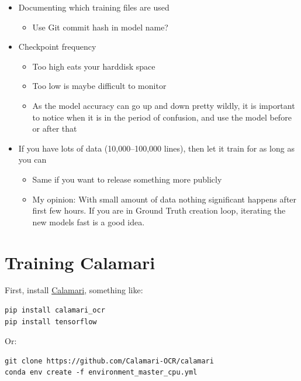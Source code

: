 \documentclass[]{book}
\providecommand{\tightlist}{%
  \setlength{\itemsep}{0pt}\setlength{\parskip}{0pt}}
\begin{document}
\begin{itemize}
\tightlist
\item
  Documenting which training files are used

  \begin{itemize}
  \tightlist
  \item
    Use Git commit hash in model name?
  \end{itemize}
\item
  Checkpoint frequency

  \begin{itemize}
  \tightlist
  \item
    Too high eats your harddisk space
  \item
    Too low is maybe difficult to monitor
  \item
    As the model accuracy can go up and down pretty wildly, it is important to notice when it is in the period of confusion, and use the model before or after that
  \end{itemize}
\item
  If you have lots of data (10,000--100,000 lines), then let it train for as long as you can

  \begin{itemize}
  \tightlist
  \item
    Same if you want to release something more publicly
  \item
    My opinion: With small amount of data nothing significant happens after first few hours. If you are in Ground Truth creation loop, iterating the new models fast is a good idea.
  \end{itemize}
\end{itemize}

\hypertarget{training-calamari}{%
\section{Training Calamari}\label{training-calamari}}

First, install \href{https://github.com/Calamari-OCR/calamari}{Calamari}, something like:

\begin{verbatim}
pip install calamari_ocr
pip install tensorflow 
\end{verbatim}

Or:

\begin{verbatim}
git clone https://github.com/Calamari-OCR/calamari
conda env create -f environment_master_cpu.yml
\end{verbatim}
\end{document}

